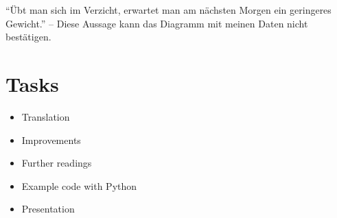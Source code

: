 ``Übt man sich im Verzicht, erwartet man am nächsten Morgen ein geringeres Gewicht.'' – Diese Aussage kann das Diagramm mit meinen Daten nicht bestätigen.


\section{Tasks}


\begin{itemize}
	\item Translation
	\item Improvements
	\item Further readings
	\item Example code with Python
	\item Presentation
\end{itemize}

